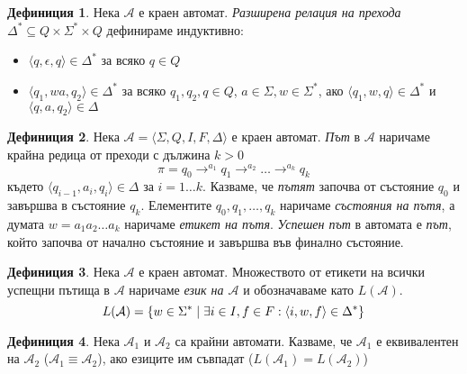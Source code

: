 \documentclass[12pt, oneside]{article}
\theoremstyle{definition}
\newtheorem{definition}{Дефиниция}[section]
\begin{document}
\begin{definition}  
	Нека \( \mathcal{A} \) е краен автомат. \emph{Разширена релация на прехода} \( \Delta^* \subseteq Q \times \Sigma^* \times Q \) дефинираме индуктивно:

	\begin{itemize}
		\item \( \langle q, \epsilon, q \rangle \in \Delta^* \) за всяко \( q \in Q \)
		\item \( \langle q_1, wa, q_2 \rangle \in \Delta^* \) за всяко \( q_1, q_2, q \in Q \), \( a \in \Sigma, w \in \Sigma^* \), ако \( \langle q_1, w, q \rangle \in \Delta^* \) и \( \langle q, a, q_2 \rangle \in \Delta \)
	\end{itemize}
\end{definition}

\begin{definition} 
	Нека \( \mathcal{A} = \langle \Sigma, Q, I, F, \Delta \rangle \) е краен автомат. \emph{Път} в \( \mathcal{A} \) наричаме крайна редица от преходи с дължина \( k > 0 \) 
	\[ \pi = q_0 \to^{a_1} q_1 \to^{a_2} \ldots \to^{a_k} q_k \] 
	където \( \langle q_{i-1}, a_i, q_i \rangle \in \Delta \) за \( i = 1 \ldots k \). Казваме, че \emph{пътят} започва от състояние \( q_0 \) и завършва в състояние \( q_k \). Елементите \( q_0,q_1, \ldots ,q_k \) наричаме \emph{състояния на пътя}, а думата \( w = a_1 a_2 \ldots a_k \) наричаме \emph{етикет на пътя}. \newline \emph{Успешен път} в автомата е \emph{път}, който започва от начално състояние и завършва във финално състояние.
\end{definition}

\begin{definition} 
	Нека \( \mathcal{A} \) е краен автомат. Множеството от етикети на всички успещни пътища в \( \mathcal{A} \) наричаме \emph{език на \( \mathcal{A} \)} и обозначаваме като \( L(\mathcal{A}) \). \[ L(\mathcal{A}) = \{ w \in \Sigma^* \hspace{0.1cm} | \hspace{0.1cm} \exists i \in I, f \in F : \langle i, w, f \rangle \in \Delta^* \} \]
\end{definition}

\begin{definition} 
	Нека \( \mathcal{A}_1 \) и \( \mathcal{A}_2 \) са крайни автомати. Казваме, че \( \mathcal{A}_1 \) е еквивалентен на \( \mathcal{A}_2 \) (\( \mathcal{A}_1 \equiv \mathcal{A}_2 \)), ако езиците им съвпадат (\( L(\mathcal{A}_1) = L(\mathcal{A}_2) \))
\end{definition}
\end{document}
